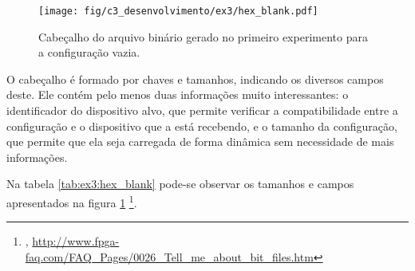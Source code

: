 \documentclass[11pt,a4paper,oneside]{book}
\begin{document}
\begin{figure}[htp]
\centering
\texttt{[image: fig/c3\_desenvolvimento/ex3/hex\_blank.pdf]}
\caption{Cabeçalho do arquivo binário gerado no primeiro experimento para a configuração vazia.}
\label{fig:ex3:hex_blank}
\end{figure}

O cabeçalho é formado por chaves e tamanhos, indicando os diversos campos deste.
Ele contém pelo menos duas informações muito interessantes: o identificador do dispositivo alvo, que permite verificar a compatibilidade entre a configuração e o dispositivo que a está recebendo, e o tamanho da configuração, que permite que ela seja carregada de forma dinâmica sem necessidade de mais informações.

Na tabela \ref{tab:ex3:hex_blank} pode-se observar os tamanhos e campos apresentados na figura \ref{fig:ex3:hex_blank} \footnote{, \url{http://www.fpga-faq.com/FAQ_Pages/0026_Tell_me_about_bit_files.htm}}.
\end{document}
